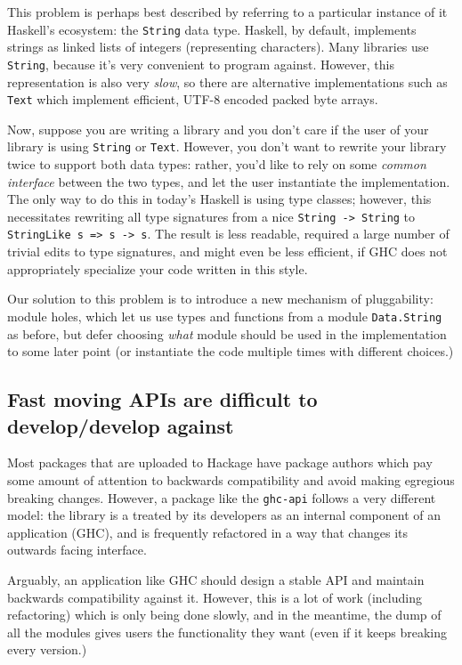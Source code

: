 \documentclass{article}
\begin{document}
This problem is perhaps best described by referring to a particular
instance of it Haskell's ecosystem: the \texttt{String} data type.  Haskell,
by default, implements strings as linked lists of integers (representing
characters).  Many libraries use \texttt{String}, because it's very
convenient to program against.  However, this representation is also
very \emph{slow}, so there are alternative implementations such as
\texttt{Text} which implement efficient, UTF-8 encoded packed byte
arrays.

Now, suppose you are writing a library and you don't care if the user of
your library is using \texttt{String} or \texttt{Text}.  However, you
don't want to rewrite your library twice to support both data types:
rather, you'd like to rely on some \emph{common interface} between the
two types, and let the user instantiate the implementation.  The only
way to do this in today's Haskell is using type classes; however, this
necessitates rewriting all type signatures from a nice \texttt{String ->
String} to \texttt{StringLike s => s -> s}.  The result is less readable,
required a large number of trivial edits to type signatures, and might
even be less efficient, if GHC does not appropriately specialize your code
written in this style.

Our solution to this problem is to introduce a new mechanism of
pluggability: module holes, which let us use types and functions from a
module \texttt{Data.String} as before, but defer choosing \emph{what}
module should be used in the implementation to some later point (or
instantiate the code multiple times with different choices.)

\subsection{Fast moving APIs are difficult to develop/develop against}

Most packages that are uploaded to Hackage have package authors which pay
some amount of attention to backwards compatibility and avoid making egregious
breaking changes.  However, a package like the \verb|ghc-api| follows a
very different model: the library is a treated by its developers as an
internal component of an application (GHC), and is frequently refactored
in a way that changes its outwards facing interface.

Arguably, an application like GHC should design a stable API and
maintain backwards compatibility against it.  However, this is a lot of
work (including refactoring) which is only being done slowly, and in the
meantime, the dump of all the modules gives users the functionality they
want (even if it keeps breaking every version.)
\end{document}
